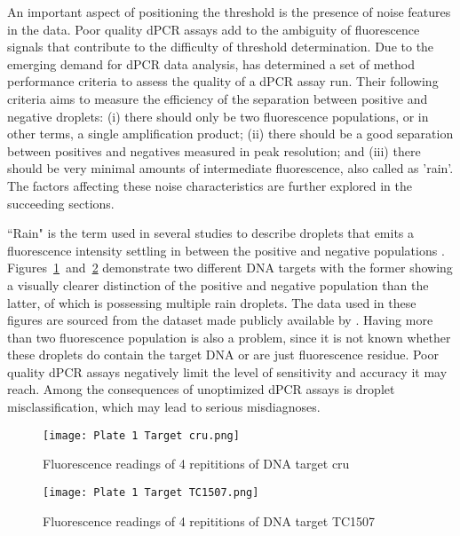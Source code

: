 An important aspect of positioning the threshold is the presence of noise features in the data. Poor quality dPCR assays add to the ambiguity of fluorescence signals that contribute to the difficulty of threshold determination. Due to the emerging demand for dPCR data analysis,  has determined a set of method performance criteria to assess the quality of a dPCR assay run. Their following criteria aims to measure the efficiency of the separation between positive and negative droplets: (i) there should only be two fluorescence populations, or in other terms, a single amplification product; (ii) there should be a good separation between positives and negatives measured in peak resolution; and (iii) there should be very minimal amounts of intermediate fluorescence, also called as 'rain'. The factors affecting these noise characteristics are further explored in the succeeding sections. 

``Rain" is the term used in several studies to describe droplets that emits a fluorescence intensity settling in between the positive and negative populations \cite{Lievens2016, Trypsteen2015, Witte2016, Dreo2014, Brink2018, Attali2016}. Figures \ref{fig:plate1cru} and \ref{fig:plate1tc1507} demonstrate two different DNA targets with the former showing a visually clearer distinction of the positive and negative population than the latter, of which is possessing multiple rain droplets. The data used in these figures are sourced from the dataset made publicly available by . Having more than two fluorescence population is also a problem, since it is not known whether these droplets do contain the target DNA or are just fluorescence residue. Poor quality dPCR assays negatively limit the level of sensitivity and accuracy it may reach. Among the consequences of unoptimized dPCR assays is droplet misclassification, which may lead to serious misdiagnoses.

\begin{figure}[h]
    \centering
    \texttt{[image: Plate 1 Target cru.png]}
    \caption{Fluorescence readings of 4 repititions of DNA target cru}
        \label{fig:plate1cru}
\end{figure}

\begin{figure}[h]
    \centering
    \texttt{[image: Plate 1 Target TC1507.png]}
    \caption{Fluorescence readings of 4 repititions of DNA target TC1507}
        \label{fig:plate1tc1507}
\end{figure}

